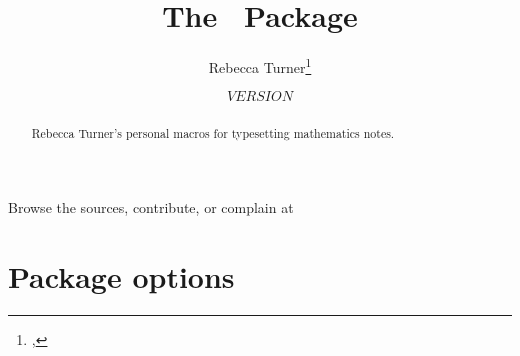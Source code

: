\documentclass{ltxguidex}
\author{Rebecca Turner\thanks{\email{rbt@sent.as}, \https{becca.ooo}}}
\title{The \mn\ Package}
\date{${VERSION}$}
\begin{document}
\maketitle

\begin{abstract}
	Rebecca Turner's personal macros for typesetting mathematics notes.
\end{abstract}

\begin{note}
	Browse the sources, contribute, or complain at \\
\end{note}

\tableofcontents
\vfill
\pagebreak

\section{Package options}
\end{document}

